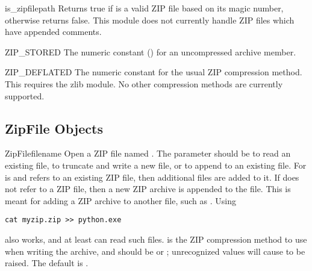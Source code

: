 \begin{funcdesc}{is_zipfile}{path} 
  Returns true if  is a valid ZIP file based on its magic
  number, otherwise returns false.  This module does not currently
  handle ZIP files which have appended comments.
\end{funcdesc}

\begin{datadesc}{ZIP_STORED}
  The numeric constant () for an uncompressed archive member.
\end{datadesc}

\begin{datadesc}{ZIP_DEFLATED}
  The numeric constant for the usual ZIP compression method.  This
  requires the zlib module.  No other compression methods are
  currently supported.
\end{datadesc}


\begin{seealso}

\end{seealso}


\subsection{ZipFile Objects \label{zipfile-objects}}

\begin{classdesc}{ZipFile}{filename} 
  Open a ZIP file named .  The  parameter
  should be  to read an existing file,  to
  truncate and write a new file, or  to append to an
  existing file.  For  is  and 
  refers to an existing ZIP file, then additional files are added to
  it.  If  does not refer to a ZIP file, then a new ZIP
  archive is appended to the file.  This is meant for adding a ZIP
  archive to another file, such as .  Using

\begin{verbatim}
cat myzip.zip >> python.exe
\end{verbatim}

  also works, and at least  can read such files.
   is the ZIP compression method to use when writing
  the archive, and should be  or
  ; unrecognized values will cause
   to be raised.  The default is
  . 
\end{classdesc}

